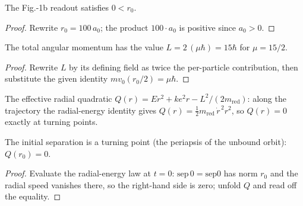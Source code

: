 \begin{lemma}
\label{lem:IPhO2026Problems_problem_IPhO_2026_1_B_2:initial_separation_pos}
The Fig.-1b readout satisfies $0 < r_0$.
\end{lemma}
\begin{proof}
Rewrite $r_0 = 100\,a_0$; the product $100 \cdot a_0$ is positive since
$a_0 > 0$.
\end{proof}

\begin{lemma}
\label{lem:IPhO2026Problems_problem_IPhO_2026_1_B_2:total_angular_momentum_value}
The total angular momentum has the value $L = 2\,(\mu\hbar) = 15\hbar$ for
$\mu = 15/2$.
\end{lemma}
\begin{proof}
Rewrite $L$ by its defining field as twice the per-particle contribution,
then substitute the given identity $m v_0 (r_0/2) = \mu\hbar$.
\end{proof}

\begin{definition}
\label{def:IPhO2026Problems_problem_IPhO_2026_1_B_2:turningQuadratic}
The effective radial quadratic
$Q(r) = E r^2 + k e^2 r - L^2/(2 m_{\mathrm{red}})$: along the trajectory
the radial-energy identity gives
$Q(r) = \tfrac{1}{2} m_{\mathrm{red}}\, \dot r^{\,2} r^2$, so $Q(r) = 0$
exactly at turning points.
\end{definition}

\begin{lemma}
\label{lem:IPhO2026Problems_problem_IPhO_2026_1_B_2:turningQuadratic_periapsis}
The initial separation is a turning point (the periapsis of the unbound
orbit): $Q(r_0) = 0$.
\end{lemma}
\begin{proof}
Evaluate the radial-energy law at $t = 0$: $\mathrm{sep}\,0 = \mathrm{sep0}$
has norm $r_0$ and the radial speed vanishes there, so the right-hand side
is zero; unfold $Q$ and read off the equality.
\end{proof}

